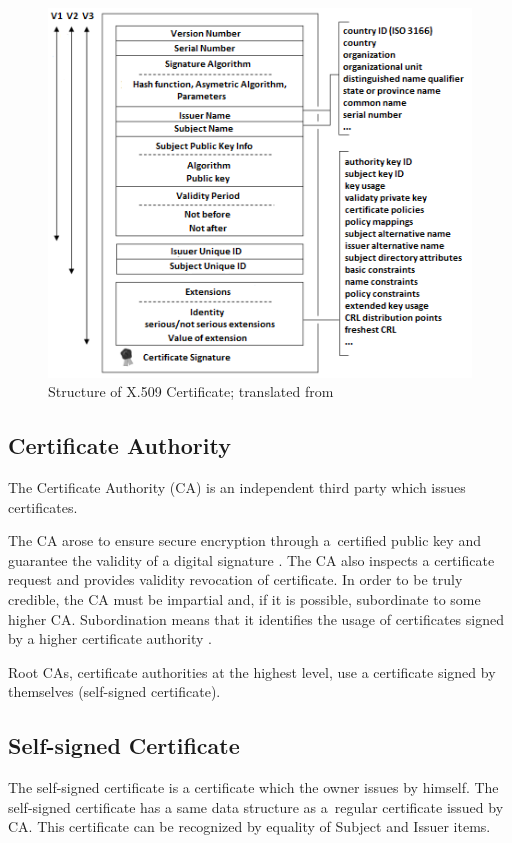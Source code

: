 \documentclass[
  oneside, 12pt, 
  printed, %
  notable,   %
  nolof,     %
  nolot,     %
]{fithesis3}
\begin{document}
\begin{figure}[th]
	\centering
	\includegraphics[width=1\textwidth]{certificate}
	\caption{Structure of X.509 Certificate; translated from \cite{ostadal_2010}}
	\label{fig:certificate}
\end{figure}

\subsection{Certificate Authority}
The Certificate Authority (CA) is an independent third party which issues certificates.

The CA arose to ensure secure encryption through a~certified public key and guarantee the validity 
of a digital signature \cite{singh2003kniha}. The CA also inspects a certificate request and 
provides validity revocation of certificate. In order to be truly credible, the CA must be 
impartial and, if it is possible, subordinate to some higher CA. Subordination means that it 
identifies the usage of certificates signed by a higher certificate authority 
\cite{dostalek2016velky}.

Root CAs, certificate authorities at the highest level, use a certificate signed by themselves 
(self-signed certificate).

\subsection{Self-signed Certificate}
The self-signed certificate is a certificate which the owner issues by himself. The self-signed 
certificate has a same data structure as a~regular certificate issued by CA. This certificate can 
be recognized by equality of Subject and Issuer items.
\end{document}

